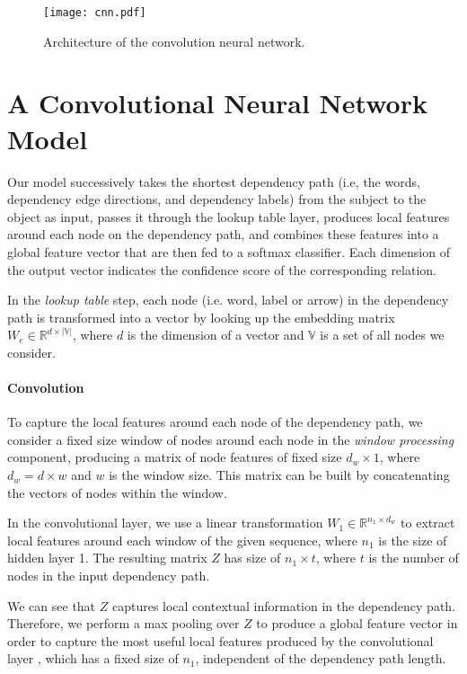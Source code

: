 \documentclass[11pt,a4paper]{article}
\begin{document}
\begin{figure}[htp!]
\centering\texttt{[image: cnn.pdf]} 
\caption{ \label{cnn} Architecture of the convolution neural network.}
\end{figure}
\section{A Convolutional Neural Network Model}


Our model successively takes the shortest dependency path (i.e, the words, dependency edge directions, and dependency labels) from the subject  to the object  as input, passes it through the lookup table layer, produces local features around each node on the dependency path, and combines these features into a global feature vector that are then fed to a softmax classifier. Each dimension of the output vector
indicates the confidence score of the corresponding relation.

In the \textit{lookup table} step, each node (i.e. word, label or arrow) in the dependency path is transformed into a vector by looking up the embedding matrix $W_e \in \mathbb{R}^{d \times |\mathbb{V}|}$, where $d$ is the dimension of a vector and $\mathbb{V}$ is a set of all nodes we consider.

\paragraph{Convolution}
To capture the local features around each node of the dependency path, we consider a fixed size window of nodes around each node in the \textit{window processing} component, producing a matrix of node features of fixed size $d_{w} \times 1$, where $d_{w} = d \times w$ and $w$ is the window size. This matrix can be built by concatenating the vectors of nodes within the window. 

In the convolutional layer, we use a linear transformation  $W_1 \in \mathbb{R}^{n_1\times d_w}$ to extract local features around each window of the given sequence, where $n_1$ is the size of hidden layer 1. 
The resulting matrix  $Z$ has size of $n_1\times t$, where $t$ is the number of nodes in the input dependency path.

We can see that $Z$ captures local contextual information in the dependency path. 
Therefore, we perform a max pooling over  $Z$ to produce a global feature vector in order to capture the 
most useful local features produced by the convolutional layer  \cite{DBLP:journals/jmlr/CollobertWBKKK11}, which has a fixed size of $n_1$, 
 independent of the dependency path length.
\end{document}
